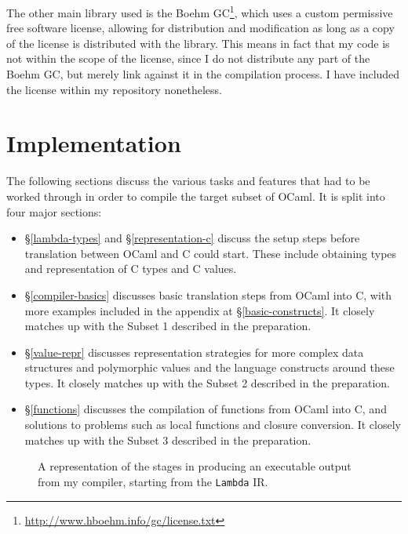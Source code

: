 The other main library used is the Boehm
GC\footnote{\url{http://www.hboehm.info/gc/license.txt}}, which uses a custom
permissive free software license, allowing for distribution and modification as
long as a copy of the license is distributed with the library. This means in
fact that my code is not within the scope of the license, since I do not
distribute any part of the Boehm GC, but merely link against it in the
compilation process. I have included the license within my repository
nonetheless.

\chapter{Implementation}

The following sections discuss the various tasks and features that had to be
worked through in order to compile the target subset of OCaml. It is split into
four major sections:

\begin{itemize}

\item \S\ref{lambda-types} and \S\ref{representation-c} discuss the setup steps
    before translation between OCaml and C could start. These include obtaining
    types and representation of C types and C values.

\item \S\ref{compiler-basics} discusses basic translation steps from OCaml into
    C, with more examples included in the appendix at \S\ref{basic-constructs}.
    It closely matches up with the Subset 1 described in the preparation.

\item \S\ref{value-repr} discusses representation strategies for more complex
    data structures and polymorphic values and the language constructs around
    these types. It closely matches up with the Subset 2 described in the
    preparation.

\item \S\ref{functions} discusses the compilation of functions from OCaml into
    C, and solutions to problems such as local functions and closure conversion.
    It closely matches up with the Subset 3 described in the preparation.

\end{itemize}

\begin{figure}
    \centering
    
    \caption{A representation of the stages in producing an executable output
    from my compiler, starting from the \texttt{Lambda} IR.}
    \label{fig:compilerpipeline}
\end{figure}

